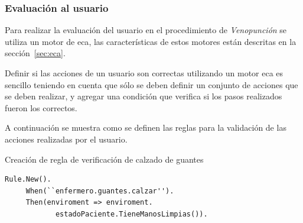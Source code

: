 %
%    
%
%
%
%

\subsubsection{Evaluación al usuario}

Para realizar la evaluación del usuario en el procedimiento de \emph{Venopunción} 
se utiliza un motor de \Gls{eca}, las características de estos motores están descritas 
en la sección~\ref{sec:eca}.

Definir si las acciones de un usuario son correctas utilizando un motor 
\Gls{eca} es sencillo teniendo en cuenta que sólo se deben definir un
conjunto de acciones que se deben realizar, y agregar una condición que verifica si
los pasos realizados fueron los correctos.


A continuación se muestra como se definen las reglas para la validación de las acciones realizadas 
por el usuario.

\begin{algorithm}[H]
\caption{Creación de regla de verificación de calzado de guantes}
\label{alg:rule_guante}
\lstset{style=sharpc}
\begin{lstlisting}
Rule.New().
     When(``enfermero.guantes.calzar'').
     Then(enviroment => enviroment.
            estadoPaciente.TieneManosLimpias()).
\end{lstlisting}
\end{algorithm}


